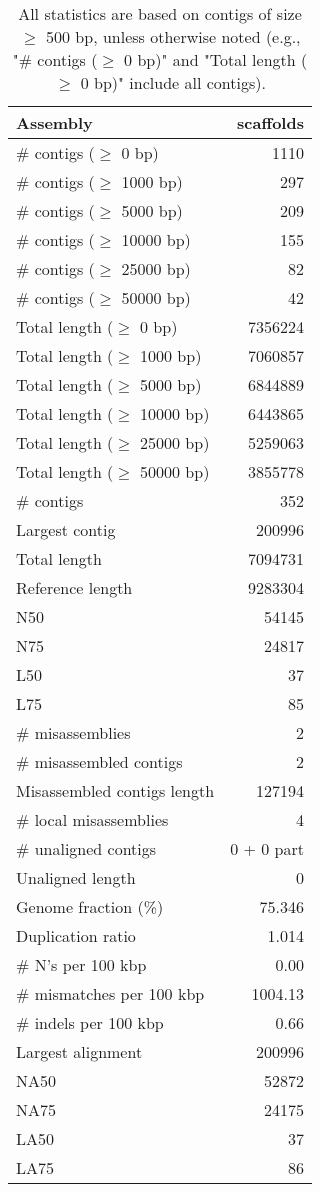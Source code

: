 \documentclass[12pt,a4paper]{article}
\begin{document}
\begin{table}[ht]
\begin{center}
\caption{All statistics are based on contigs of size $\geq$ 500 bp, unless otherwise noted (e.g., "\# contigs ($\geq$ 0 bp)" and "Total length ($\geq$ 0 bp)" include all contigs).}
\begin{tabular}{|l*{1}{|r}|}
\hline
Assembly & scaffolds \\ \hline
\# contigs ($\geq$ 0 bp) & 1110 \\ \hline
\# contigs ($\geq$ 1000 bp) & 297 \\ \hline
\# contigs ($\geq$ 5000 bp) & 209 \\ \hline
\# contigs ($\geq$ 10000 bp) & 155 \\ \hline
\# contigs ($\geq$ 25000 bp) & 82 \\ \hline
\# contigs ($\geq$ 50000 bp) & 42 \\ \hline
Total length ($\geq$ 0 bp) & 7356224 \\ \hline
Total length ($\geq$ 1000 bp) & 7060857 \\ \hline
Total length ($\geq$ 5000 bp) & 6844889 \\ \hline
Total length ($\geq$ 10000 bp) & 6443865 \\ \hline
Total length ($\geq$ 25000 bp) & 5259063 \\ \hline
Total length ($\geq$ 50000 bp) & 3855778 \\ \hline
\# contigs & 352 \\ \hline
Largest contig & 200996 \\ \hline
Total length & 7094731 \\ \hline
Reference length & 9283304 \\ \hline
N50 & 54145 \\ \hline
N75 & 24817 \\ \hline
L50 & 37 \\ \hline
L75 & 85 \\ \hline
\# misassemblies & 2 \\ \hline
\# misassembled contigs & 2 \\ \hline
Misassembled contigs length & 127194 \\ \hline
\# local misassemblies & 4 \\ \hline
\# unaligned contigs & 0 + 0 part \\ \hline
Unaligned length & 0 \\ \hline
Genome fraction (\%) & 75.346 \\ \hline
Duplication ratio & 1.014 \\ \hline
\# N's per 100 kbp & 0.00 \\ \hline
\# mismatches per 100 kbp & 1004.13 \\ \hline
\# indels per 100 kbp & 0.66 \\ \hline
Largest alignment & 200996 \\ \hline
NA50 & 52872 \\ \hline
NA75 & 24175 \\ \hline
LA50 & 37 \\ \hline
LA75 & 86 \\ \hline
\end{tabular}
\end{center}
\end{table}
\end{document}
